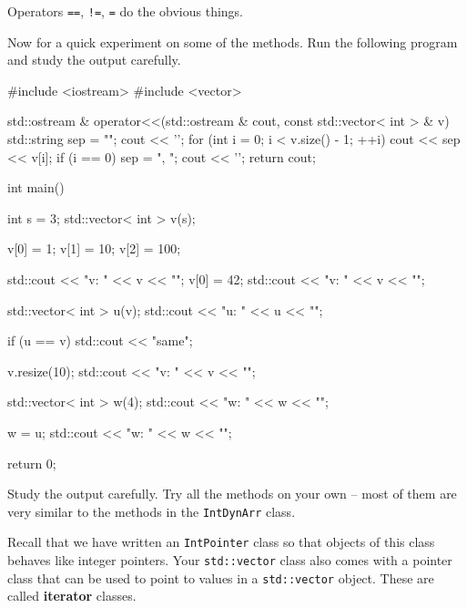 Operators \texttt{==}, \texttt{!=}, \texttt{=} do the obvious things.

Now for a quick experiment on some of the methods. Run the following
program and study the output carefully.

\begin{console}
#include <iostream>
#include <vector>

std::ostream & operator<<(std::ostream & cout,
               const std::vector< int > & v)
{     
      std::string sep = "";
      cout << '{';
      for (int i = 0; i < v.size() - 1; ++i)
      {   
          cout << sep << v[i];
          if (i == 0) sep = ", ";
      }
      cout << '}';
      return cout;
}

int main()
{   
    int s = 3;
    std::vector< int > v(s);
    
    v[0] = 1; v[1] = 10; v[2] = 100;

    std::cout << "v: " << v << "\n";
    v[0] = 42;
    std::cout << "v: " << v << "\n";

    std::vector< int > u(v);
    std::cout << "u: " << u << "\n";

    if (u == v)
    {  
       std::cout << "same\n";
    }

    v.resize(10);
    std::cout << "v: " << v << "\n";

    std::vector< int > w(4);
    std::cout << "w: " << w << "\n";

    w = u;
    std::cout << "w: " << w << "\n";

    return 0;
}
\end{console}

Study the output carefully. Try all the methods on your own -- most of
them are very similar to the methods in the \texttt{IntDynArr} class.

\newpage{}

Recall that we have written an \texttt{IntPointer} class so that objects
of this class behaves like integer pointers. Your \texttt{std::vector}
class also comes with a pointer class that can be used to point to
values in a \texttt{std::vector} object. These are called
\textbf{iterator} classes.

